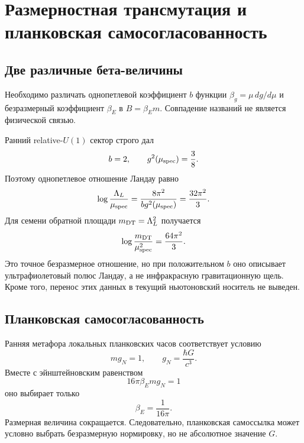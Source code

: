 \chapter{Размерностная трансмутация и планковская самосогласованность}
\label{ch:v10-induced-newton-dimensional-transmutation}

\section{Две различные бета-величины}

Необходимо различать однопетлевой коэффициент $b$ функции
$\beta_g=\mu\,dg/d\mu$ и безразмерный коэффициент $\beta_E$ в
$B=\beta_E m$. Совпадение названий не является физической связью.

Ранний relative-$U(1)$ сектор строго дал
\begin{equation}
 b=2,
 \qquad g^2(\mu_{\rm spec})=\frac38.
 \label{eq:v10-newton-dt-inherited-data}
\end{equation}
Поэтому однопетлевое отношение Ландау равно
\begin{equation}
 \log\frac{\Lambda_L}{\mu_{\rm spec}}
 =\frac{8\pi^2}{b g^2(\mu_{\rm spec})}
 =\frac{32\pi^2}{3}.
 \label{eq:v10-newton-dt-landau-ratio}
\end{equation}
Для семени обратной площади $m_{\rm DT}=\Lambda_L^2$ получается
\begin{equation}
 \log\frac{m_{\rm DT}}{\mu_{\rm spec}^2}
 =\frac{64\pi^2}{3}.
 \label{eq:v10-newton-dt-seed-ratio}
\end{equation}
Это точное безразмерное отношение, но при положительном $b$ оно описывает
ультрафиолетовый полюс Ландау, а не инфракрасную гравитационную щель.
Кроме того, перенос этих данных в текущий ньютоновский носитель не выведен.

\section{Планковская самосогласованность}

Ранняя метафора локальных планковских часов соответствует условию
\begin{equation}
 m g_N=1,
 \qquad g_N=\frac{\hbar G}{c^3}.
 \label{eq:v10-newton-dt-planck-condition}
\end{equation}
Вместе с эйнштейновским равенством
\begin{equation}
 16\pi\beta_E m g_N=1
 \label{eq:v10-newton-dt-einstein-condition}
\end{equation}
оно выбирает только
\begin{equation}
 \boxed{\beta_E=\frac1{16\pi}}.
 \label{eq:v10-newton-dt-beta-E}
\end{equation}
Размерная величина сокращается. Следовательно, планковская самоссылка может
условно выбрать безразмерную нормировку, но не абсолютное значение $G$.

